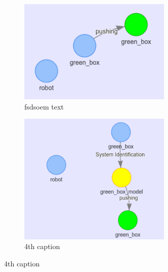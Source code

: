 \begin{figure}[H]
    \begin{subfigure}{.49\textwidth}
    \centering
    \includegraphics[width=0.8\textwidth]{figures/example_hyp_graph/2}
    \caption{fsdsoem text}%
    \end{subfigure}
    \hfill
    \begin{subfigure}{.49\textwidth}
    \centering
    \includegraphics[width=0.8\textwidth]{figures/example_hyp_graph/3}
    \caption{4th caption}%
    \end{subfigure}


\end{figure}
